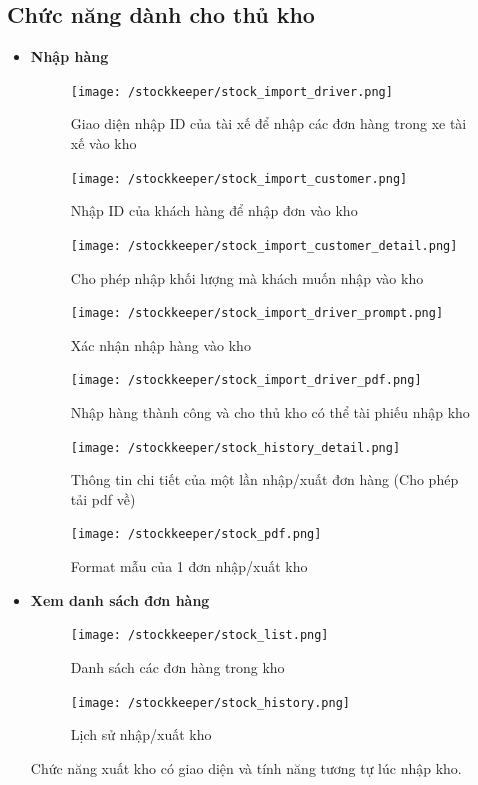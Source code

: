 \subsection{Chức năng dành cho thủ kho}
\begin{itemize}
	\item \textbf{Nhập hàng}
	\begin{figure}[H]
		\texttt{[image: /stockkeeper/stock\_import\_driver.png]}
		\centering
		\caption{Giao diện nhập ID của tài xế để nhập các đơn hàng trong xe tài xế vào kho}
	\end{figure}

	\begin{figure}[H]
		\texttt{[image: /stockkeeper/stock\_import\_customer.png]}
		\centering
		\caption{Nhập ID của khách hàng để nhập đơn vào kho}
	\end{figure}

	\begin{figure}[H]
		\texttt{[image: /stockkeeper/stock\_import\_customer\_detail.png]}
		\centering
		\caption{Cho phép nhập khối lượng mà khách muốn nhập vào kho}
	\end{figure}
	
	\begin{figure}[H]
		\texttt{[image: /stockkeeper/stock\_import\_driver\_prompt.png]}
		\centering
		\caption{Xác nhận nhập hàng vào kho}
	\end{figure}
	
	\begin{figure}[H]
		\texttt{[image: /stockkeeper/stock\_import\_driver\_pdf.png]}
		\centering
		\caption{Nhập hàng thành công và cho thủ kho có thể tài phiếu nhập kho}
	\end{figure}

	\begin{figure}[H]
		\texttt{[image: /stockkeeper/stock\_history\_detail.png]}
		\centering
		\caption{Thông tin chi tiết của một lần nhập/xuất đơn hàng (Cho phép tải pdf về)}
	\end{figure}
	
	\begin{figure}[H]
		\texttt{[image: /stockkeeper/stock\_pdf.png]}
		\centering
		\caption{Format mẫu của 1 đơn nhập/xuất kho}
	\end{figure}
	
	
	\item \textbf{Xem danh sách đơn hàng}
	\begin{figure}[H]
		\texttt{[image: /stockkeeper/stock\_list.png]}
		\centering
		\caption{Danh sách các đơn hàng trong kho}
	\end{figure}

	\begin{figure}[H]
		\texttt{[image: /stockkeeper/stock\_history.png]}
		\centering
		\caption{Lịch sử nhập/xuất kho}
	\end{figure}
	
	Chức năng xuất kho có giao diện và tính năng tương tự lúc nhập kho.
	
\end{itemize}

